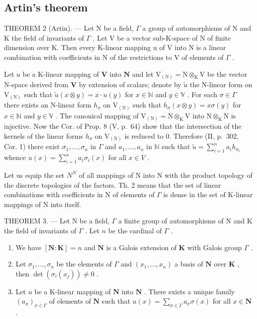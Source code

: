 \subsection{Artin's theorem}

THEOREM 2 (Artin). --- Let N be a field, \(\Gamma\) a group of automorphisms of N and K the field of invariants of \(\Gamma\) . Let V be a vector sub-K-space of N of finite dimension over K. Then every K-linear mapping u of V into N is a linear combination with coefficients in N of the restrictions to V of elements of \(\Gamma\) .

Let \(u\) be a K-linear mapping of \(\mathbf{V}\) into \(\mathbf{N}\) and let \(\mathrm{V}_{(\mathrm{N})} = \mathrm{N} \otimes_{\mathrm{K}} \mathrm{V}\) be the vector N-space derived from \(\mathbf{V}\) by extension of scalars; denote by \(\tilde{u}\) the N-linear form on \(\mathrm{V}_{(\mathrm{N})}\) such that \(\tilde{u}(x \otimes y) = x \cdot u(y)\) for \(x \in \mathbb{N}\) and \(y \in \mathbb{V}\) . For each \(\sigma \in \Gamma\) there exists an N-linear form \(h_{\sigma}\) on \(\mathrm{V}_{(\mathrm{N})}\) such that \(h_{\sigma}(x \otimes y) = x \sigma(y)\) for \(x \in \mathbb{N}\) and \(y \in \mathbb{V}\) . The canonical mapping of \(\mathrm{V}_{(\mathrm{N})} = \mathrm{N} \otimes_{\mathrm{K}} \mathrm{V}\) into \(\mathrm{N} \otimes_{\mathrm{K}} \mathrm{N}\) is injective. Now the Cor. of Prop. 8 (V, p.~64) show that the intersection of the kernels of the linear forms \(h_{\sigma}\) on \(\mathrm{V}_{(\mathrm{N})}\) is reduced to 0. Therefore (II, p.~302, Cor. 1) there exist \(\sigma_1, \ldots, \sigma_n\) in \(\Gamma\) and \(a_1, \ldots, a_n\) in \(\mathbb{N}\) such that \(\tilde{u} = \sum_{i=1}^{n} a_i h_{\sigma_i}\) whence \(u(x) = \sum_{i=1}^{n} a_i \sigma_i(x)\) for all \(x \in V\) .

Let us equip the set \(N^{N}\) of all mappings of N into N with the product topology of the discrete topologies of the factors. Th. 2 means that the set of linear combinations with coefficients in N of elements of \(\Gamma\) is dense in the set of K-linear mappings of N into itself.

THEOREM 3. --- Let N be a field, \(\Gamma\) a finite group of automorphisms of N and K the field of invariants of \(\Gamma\) . Let \(n\) be the cardinal of \(\Gamma\) .

\begin{enumerate}
\def\labelenumi{\alph{enumi})}
\item
  We have \([\mathbf{N}:\mathbf{K}] = n\) and \(\mathbf{N}\) is a Galois extension of \(\mathbf{K}\) with Galois group \(\Gamma\) .
\item
  Let \(\sigma_1, \ldots, \sigma_n\) be the elements of \(\Gamma\) and \((x_1, \ldots, x_n)\) a basis of \(\mathbf{N}\) over \(\mathbf{K}\) , then \(\det (\sigma_i(x_j)) \neq 0\) .
\item
  Let \(u\) be a K-linear mapping of \(\mathbf{N}\) into \(\mathbf{N}\) . There exists a unique family \((a_{\sigma})_{\sigma \in \Gamma}\) of elements of \(\mathbf{N}\) such that \(u(x) = \sum_{\sigma \in \Gamma} a_{\sigma} \sigma(x)\) for all \(x \in \mathbf{N}\) .
\end{enumerate}

